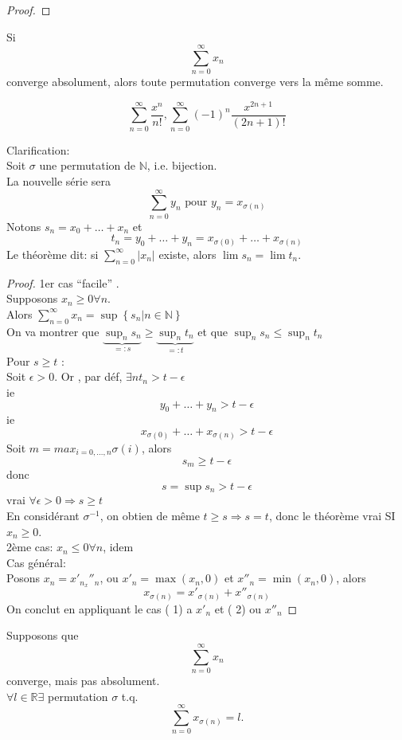 \documentclass[../main.tex]{subfiles}
\begin{document}
\begin{exemple}
\begin{proof}
\end{proof}
\begin{thm}
Si 
\[ 
\sum_{n=0}^{ \infty} x_n 
\]
converge absolument, alors toute permutation converge vers la même somme.
\end{thm}
\begin{exemple}
\[ 
	\sum_{n=0}^{ \infty} \frac{x^{n}}{n!}, \sum_{n=0}^{ \infty} (-1)^{n} \frac{x^{2n+1}}{(2n+1)!}
\]
\end{exemple}
Clarification:\\
Soit $\sigma$ une permutation de $\mathbb{N}$, i.e. bijection.\\
La nouvelle série sera
\[ 
	\sum_{n=0}^{ \infty} y_n \text{ pour } y_n = x_{\sigma(n)} 
\]
Notons $s_n = x_0 + \ldots + x_n$ et 
\[ 
	t_n = y_0 + \ldots + y_n = x_{\sigma(0)} + \ldots + x_{\sigma(n)} 
\]
Le théorème dit: si $ \sum_{n=0}^{ \infty} |x_n|$ existe, alors $\lim s_n = \lim t_n$.
\begin{proof}
1er cas ``facile'' .\\
Supposons $x_n \geq 0 \forall n$.\\
Alors $ \sum_{n=0}^{ \infty} x_n = \sup \left\{ s_n | n \in \mathbb{N} \right\} $\\
On va montrer que $ \underbrace{\sup_n s_n}_{=:s} \geq \underbrace{\sup_n t_n}_{=:t}$ et que $ \sup_n s_n \leq \sup_n t_n$\\
Pour $s \geq t$ : \\
Soit $\epsilon > 0$. Or , par déf, $\exists n t_n > t - \epsilon$\\
ie
\[ 
y_0 + \ldots + y_n > t- \epsilon
\]
ie
\[ 
	x_{\sigma(0)} + \ldots + x_{\sigma(n)} > t - \epsilon
\]
Soit $m = max_{i=0,\ldots, n} \sigma(i)$, alors
\[ 
s_m \geq t - \epsilon
\]
donc 
\[ 
s = \sup s_n > t - \epsilon
\]
vrai $\forall \epsilon> 0 \Rightarrow  s \geq t$\\
En considérant $\sigma ^{-1}$, on obtien de même $t \geq s \Rightarrow s =t$, donc
le théorème vrai SI $x_n \geq 0$.\\
2ème cas: $x_n \leq 0 \forall n$, idem\\
Cas général:\\
Posons $x_n = x'_n _ x''_n$, ou
$x'_n = \max(x_n,0)$ et $x''_n = \min(x_n,0)$, alors
 \[ 
	 x_{\sigma(n)}  = x'_{\sigma(n)}  + x''_{\sigma(n)}
\]
On conclut en appliquant le cas ( 1) a  $x'_n$ et ( 2) ou $x''_n$
\end{proof}
\begin{thm}
Supposons que 
\[ 
\sum_{n=0}^{ \infty} x_n
\]
converge, mais pas absolument.\\
$\forall l \in \mathbb{R} \exists $ permutation $\sigma$ t.q.
\[ 
	\sum_{n=0}^{ \infty} x_{\sigma(n)}  = l.
\]

\end{thm}


\end{exemple}
\end{document}
